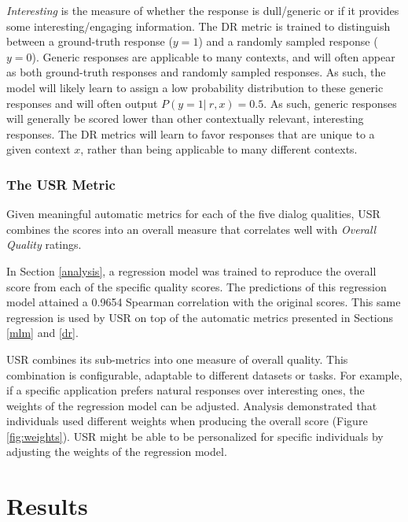 \documentclass[11pt,a4paper]{article}
\begin{document}
\textit{Interesting} is the measure of whether the response is dull/generic or if it provides some interesting/engaging information. The DR metric is trained to distinguish between a ground-truth response ($y=1$) and a randomly sampled response ($y=0$). Generic responses are applicable to many contexts, and will often appear as both ground-truth responses and randomly sampled responses. As such, the model will likely learn to assign a low probability distribution to these generic responses and will often output $P(y=1 | ~r, x) = 0.5$. As such, generic responses will generally be scored lower than other contextually relevant, interesting responses. The DR metrics will learn to favor responses that are unique to a given context $x$, rather than being applicable to many different contexts.
\label{dr}

\subsubsection{The USR Metric}

Given meaningful automatic metrics for each of the five dialog qualities, USR combines the scores into an overall measure that correlates well with \textit{Overall Quality} ratings. 

In Section \ref{analysis}, a regression model was trained to reproduce the overall score from each of the specific quality scores. The predictions of this regression model attained a 0.9654 Spearman correlation with the original scores. This same regression is used by USR on top of the automatic metrics presented in Sections \ref{mlm} and \ref{dr}. 

USR combines its sub-metrics into one measure of overall quality. This combination is configurable, adaptable to different datasets or tasks. For example, if a specific application prefers natural responses over interesting ones, the weights of the regression model can be adjusted. Analysis demonstrated that individuals used different weights when producing the overall score (Figure \ref{fig:weights}). USR might be able to be personalized for specific individuals by adjusting the weights of the regression model.









\section{Results}
\end{document}
